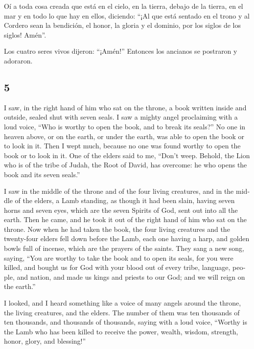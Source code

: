 \begin{paracol}{2}
 Oí a toda cosa creada que está en el cielo, en la
tierra, debajo de la tierra, en el mar y en todo lo que hay en ellos,
diciendo: ``¡Al que está sentado en el trono y al Cordero sean la
bendición, el honor, la gloria y el dominio, por los siglos de los
siglos! Amén''.

 Los cuatro seres vivos dijeron: ``¡Amén!'' Entonces los
ancianos se postraron y adoraron.

\switchcolumn
\begin{otherlanguage}{english}

\hypertarget{section-9}{%
\section{5}\label{section-9}}

 I saw, in the right hand of him who sat on the throne, a
book written inside and outside, sealed shut with seven seals.
 I saw a mighty angel proclaiming with a loud voice, ``Who
is worthy to open the book, and to break its seals?''  No
one in heaven above, or on the earth, or under the earth, was able to
open the book or to look in it.  Then I wept much, because
no one was found worthy to open the book or to look in it.
 One of the elders said to me, ``Don't weep. Behold, the
Lion who is of the tribe of Judah, the Root of David, has overcome: he
who opens the book and its seven seals.''

 I saw in the middle of the throne and of the four living
creatures, and in the middle of the elders, a Lamb standing, as though
it had been slain, having seven horns and seven eyes, which are the
seven Spirits of God, sent out into all the earth.  Then
he came, and he took it out of the right hand of him who sat on the
throne.  Now when he had taken the book, the four living
creatures and the twenty-four elders fell down before the Lamb, each one
having a harp, and golden bowls full of incense, which are the prayers
of the saints.  They sang a new song, saying, ``You are
worthy to take the book and to open its seals, for you were killed, and
bought us for God with your blood out of every tribe, language, people,
and nation,  and made us kings and priests to our God;
and we will reign on the earth.''

 I looked, and I heard something like a voice of many
angels around the throne, the living creatures, and the elders. The
number of them was ten thousands of ten thousands, and thousands of
thousands,  saying with a loud voice, ``Worthy is the
Lamb who has been killed to receive the power, wealth, wisdom, strength,
honor, glory, and blessing!''


\end{otherlanguage}
\end{paracol}
